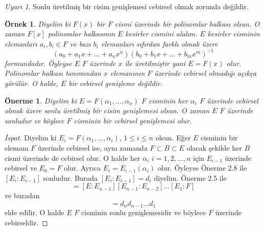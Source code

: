 \documentclass[draft]{article}
\newtheorem{prop}[thm]{Önerme}
\newtheorem{exmp}{Örnek}
\theoremstyle{definition}
\theoremstyle{remark}
\newtheorem{rem}{Uyarı}[section]
\begin{document}
            \begin{rem}
                Sonlu üretilmiş bir cisim genişlemesi cebirsel olmak zorunda değildir.
            \end{rem}
            
             \begin{exmp}
                Diyelim ki $F(x)$ bir $F$ cismi üzerinde bir polinomlar halkası olsun. O zaman $F[x]$ polinomlar halkasının $E$ kesirler cismini alalım. $E$ kesirler cisminin elemanları $a_i, b_i \in F$ ve bazı $b_i$ elemanları sıfırdan farklı olmak üzere
                \begin{equation*}
                    (a_0 + a_1x + \dots + a_nx^n)(b_0 + b_1x + \dots + b_mx^m)^{-1}
                \end{equation*}
                formundadır. Öyleyse $E$ $F$ üzerinde $x$ ile üretilmiştir yani $E = F(x)$ olur. Polinomlar halkası tanımından $x$ elemanının $F$ üzerinde cebirsel olmadığı açıkça görülür. O halde, $E$ bir cebirsel genişleme değildir.
            \end{exmp}
            
            \begin{prop}
                Diyelim ki $E = F(\alpha_1, \dots, \alpha_n)$ $F$ cisminin her $\alpha_i$ $F$ üzerinde cebirsel olmak üzere sonlu üretilmiş bir cisim genişlemesi olsun. O zaman $E$ $F$ üzerinde sonludur ve böylece $F$ cisminin bir cebirsel genişlemesi olur.
            \end{prop}
            
            \begin{proof}[İspat]
                Diyelim ki $E_i = F(\alpha_1, \dots, \alpha_i)$, $1 \leq i \leq n$ olsun. Eğer $E$ cisminin bir elemanı $F$ üzerinde cebirsel ise, aynı zamanda $F \subset B \subset E$ olacak şekilde her $B$ cismi üzerinde de cebirsel olur. O halde her $\alpha_i$ $i = 1, 2, \dots, n$ için $E_{i - 1}$ üzerinde cebirsel ve $E_0 = F$ olur. Ayrıca $E_i = E_{i - 1}(\alpha_i)$ olur. Öyleyse Önerme 2.8 ile $[E_i : E_{i - 1}]$ sonludur. Burada $[E_i : E_{i - 1}] = d_i$ diyelim. Önerme 2.5 ile
                \begin{equation*}
                    [E:F] = [E:E_{n - 1}][E_{n - 1}:E_{n - 2}] \dots [E_1:F]
                \end{equation*}
                ve buradan
                \begin{equation*}
                    [E:F] = d_nd_{n - 1} \dots d_1
                \end{equation*}
                elde edilir. O halde $E$ $F$ cisminin sonlu genişlemesidir ve böylece $F$ üzerinde cebirseldir.
            \end{proof}
            
\end{document}
